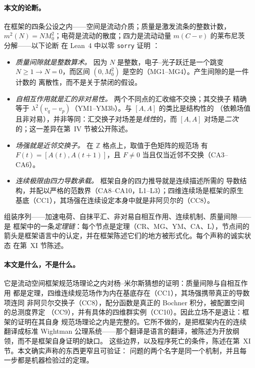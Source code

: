 \documentclass[aps,prd,preprint,superscriptaddress,amsmath,amssymb]{revtex4-2}
\begin{document}
\paragraph{本文的论断。}
在框架的四条公设之内——空间是流动介质；质量是激发流条的整数计数，$m^2(N)=N
M_0^2$；电荷是流动的散度；四力是流动动量 $m(C-v)$ 的莱布尼茨分解——以下论断
在 Lean~4 中以零 \texttt{sorry} 证明 \cite{de2015lean,ProjectionPhysics}：
\begin{itemize}
\item \emph{质量间隙就是整数算术。} 因为 $N$ 是整数，电子--光子跃迁是一个跳变
$N\ge1\to N=0$，而区间 $(0,M_0^2)$ 是空的（MG1--MG4）。产生间隙的是一件计数的
离散性，而不是关于禁闭的假设。
\item \emph{自相互作用就是汇的非对易性。} 两个不同点的汇收缩不交换；其交换子
精确等于 $\lambda^2(v_q-v_p)$（YM1--YM3b）。与 $[A,A]$ 的类比是结构性的
（依赖场值且非对易），并非等同：汇交换子对场差是\emph{线性}的，而 $[A,A]$
对场是\emph{二次}的；这一差异在第~IV 节被公开陈述。
\item \emph{场强就是近邻交换子。} 在 $\mathbb{Z}$ 格点上，取值于色矩阵的规范场
有 $F(t)=[A(t),A(t{+}1)]$，且 $F\neq0$ 当且仅当近邻不交换（CA3--CA6）。
\item \emph{连续极限由四力导数承载。} 框架自身的四力推导就是连续描述所需的
导数结构，并配以严格的范数界（CA8--CA10，L1--L3）；四维连续场是框架的原生
基底（CC1），其场强在连续设定本身中就是非阿贝尔的（CC8）。
\end{itemize}
组装序列——加速电荷、自抹平汇、非对易自相互作用、连续机制、质量间隙——是
框架中的一条\emph{定理链}：每个节点是定理（CR、MG、YM、CA、L），节点间的
箭头是框架语言中的认定，并在框架陈述它们的地方被形式化。每个声称的诚实状态
在第~XI 节陈述。

\paragraph{本文是什么，不是什么。}
它是流动空间框架规范场理论之内对杨--米尔斯猜想的证明：质量间隙与自相互作用
都是定理，四维连续规范场作为内在基底存在（CC1），其场强携带真正的导数项连同
非阿贝尔交换子（CC8），配分函数是真正的 Bochner 积分，被配置空间的总测度界定
（CC9），并有具体的四维群实例（CC10）。因此立场不是退让：框架的证明在其自身
规范场理论之内是完整的。它所不做的，是把框架内在的连续翻译成标准 Wightman
公理系统——那个翻译是语言的翻译，被陈述为开放纲领，而不是框架自身证明的缺口。
这些边界，以及程序死亡的条件，陈述在第~XI 节。本文确实声称的东西更窄且可验证：
问题的两个名字是同一个机制，并且每一步都是机器检验过的定理。
\end{document}
